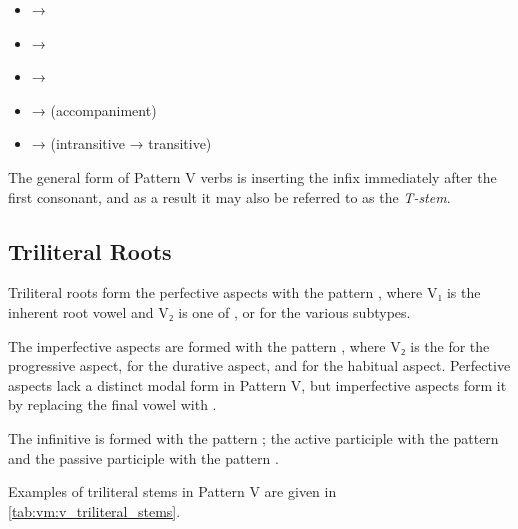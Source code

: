 \documentclass[grammar]{subfiles}
\begin{document}
\begin{itemize}
  \item {} → 
  \item {} → 
  \item {} → 
  \item {} →  (accompaniment)
  \item {} →  (intransitive → transitive)
\end{itemize}

The general form of Pattern V verbs is inserting the infix  immediately
after the first consonant, and as a result it may also be referred to as the \emph{T-stem}. 


\subsection{Triliteral Roots}
\label{ssec:vm:v_triliteral_roots}

Triliteral roots form the perfective aspects with the pattern
, where V₁ is the inherent root vowel and V₂ is one of ,
 or  for the various subtypes.  

The imperfective aspects are formed with the pattern , where
V₂ is the  for the progressive aspect,  for the durative aspect,
and  for the habitual aspect.  Perfective aspects lack a distinct modal
form in Pattern V, but imperfective aspects form it by replacing the final
vowel with . 

The infinitive is formed with the pattern ; the active
participle with the pattern  and the passive participle with the
pattern . 

Examples of triliteral stems in Pattern V are given in
\cref{tab:vm:v_triliteral_stems}. 
\end{document}
